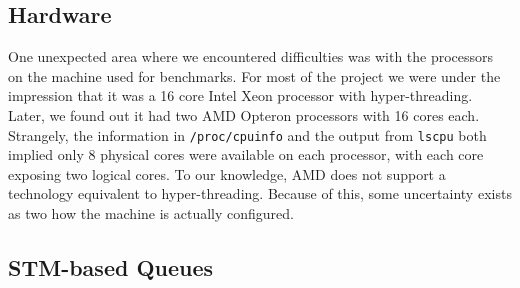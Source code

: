 \subsection{Hardware}
\label{sub:hardware}
One unexpected area where we encountered difficulties was with the processors
on the machine used for benchmarks. For most of the project we were under the
impression that it was a 16 core Intel Xeon processor with hyper-threading.
Later, we found out it had two AMD Opteron processors with 16 cores each.
Strangely, the information in \texttt{/proc/cpuinfo} and the output from
\texttt{lscpu} both implied only 8 physical cores were available on each
processor, with each core exposing two logical cores. To our knowledge, AMD
does not support a technology equivalent to hyper-threading. Because of this,
some uncertainty exists as two how the machine is actually configured.

\subsection{STM-based Queues}
\label{sub:stm_queues}

